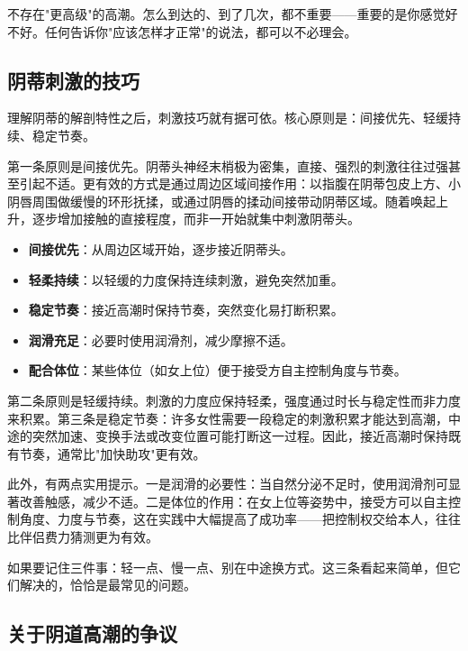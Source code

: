 \documentclass[12pt,UTF8]{ctexbook}
\newcommand{\keyword}[1]{\textbf{#1}}
\begin{document}
\begin{tcolorbox}[colback=pink!5!white,colframe=red!50!black,title=贴心小叮咛]
不存在"更高级"的高潮。怎么到达的、到了几次，都不重要——重要的是你感觉好不好。任何告诉你"应该怎样才正常"的说法，都可以不必理会。
\end{tcolorbox}
\subsection{阴蒂刺激的技巧}

理解阴蒂的解剖特性之后，刺激技巧就有据可依。核心原则是：间接优先、轻缓持续、稳定节奏。

第一条原则是间接优先。阴蒂头神经末梢极为密集，直接、强烈的刺激往往过强甚至引起不适。更有效的方式是通过周边区域间接作用：以指腹在阴蒂包皮上方、小阴唇周围做缓慢的环形抚揉，或通过阴唇的揉动间接带动阴蒂区域。随着唤起上升，逐步增加接触的直接程度，而非一开始就集中刺激阴蒂头。

\begin{itemize}
  \item \keyword{间接优先}：从周边区域开始，逐步接近阴蒂头。
  \item \keyword{轻柔持续}：以轻缓的力度保持连续刺激，避免突然加重。
  \item \keyword{稳定节奏}：接近高潮时保持节奏，突然变化易打断积累。
  \item \keyword{润滑充足}：必要时使用润滑剂，减少摩擦不适。
  \item \keyword{配合体位}：某些体位（如女上位）便于接受方自主控制角度与节奏。
\end{itemize}

第二条原则是轻缓持续。刺激的力度应保持轻柔，强度通过时长与稳定性而非力度来积累。第三条是稳定节奏：许多女性需要一段稳定的刺激积累才能达到高潮，中途的突然加速、变换手法或改变位置可能打断这一过程。因此，接近高潮时保持既有节奏，通常比"加快助攻"更有效。

此外，有两点实用提示。一是润滑的必要性：当自然分泌不足时，使用润滑剂可显著改善触感，减少不适。二是体位的作用：在女上位等姿势中，接受方可以自主控制角度、力度与节奏，这在实践中大幅提高了成功率——把控制权交给本人，往往比伴侣费力猜测更为有效。

\begin{tcolorbox}[colback=pink!5!white,colframe=red!50!black,title=贴心小叮咛]
如果要记住三件事：轻一点、慢一点、别在中途换方式。这三条看起来简单，但它们解决的，恰恰是最常见的问题。
\end{tcolorbox}
\subsection{关于阴道高潮的争议}
\end{document}
